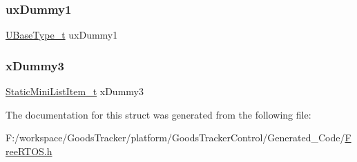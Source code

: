 \subsubsection{\texorpdfstring{ux\+Dummy1}{uxDummy1}}
{\footnotesize\ttfamily \hyperlink{portmacro_8h_a646f89d4298e4f5afd522202b11cb2e6}{U\+Base\+Type\+\_\+t} ux\+Dummy1}

\mbox{\label{structx_s_t_a_t_i_c___l_i_s_t_a22f81ad5d2e6efe9c850330af339ac02}} 
\subsubsection{\texorpdfstring{x\+Dummy3}{xDummy3}}
{\footnotesize\ttfamily \hyperlink{_free_r_t_o_s_8h_a9097f48f4dfa56e8e01d9179462c7994}{Static\+Mini\+List\+Item\+\_\+t} x\+Dummy3}



The documentation for this struct was generated from the following file\+:\begin{DoxyCompactItemize}
\item 
F\+:/workspace/\+Goods\+Tracker/platform/\+Goods\+Tracker\+Control/\+Generated\+\_\+\+Code/\hyperlink{_free_r_t_o_s_8h}{Free\+R\+T\+O\+S.\+h}\end{DoxyCompactItemize}
